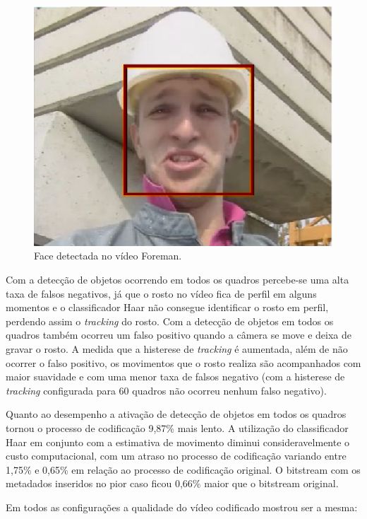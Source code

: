 \begin{figure}[H]
\centering
\includegraphics[scale=0.6]{imagens/fig21.eps}
\caption{Face detectada no vídeo Foreman.}
\label{fig:foreman_example}
\end{figure}

Com a detecção de objetos ocorrendo em todos os quadros percebe-se uma alta taxa de falsos negativos, já que o rosto no vídeo fica de perfil em alguns momentos e o classificador Haar não consegue identificar o rosto em perfil, perdendo assim o \textit{tracking} do rosto. Com a detecção de objetos em todos os quadros também ocorreu um falso positivo quando a câmera se move e deixa de gravar o rosto. A medida que a histerese de \textit{tracking} é aumentada, além de não ocorrer o falso positivo, os movimentos que o rosto realiza são acompanhados com maior suavidade e com uma menor taxa de falsos negativo (com a histerese de \textit{tracking} configurada para 60 quadros não ocorreu nenhum falso negativo). 

Quanto ao desempenho a ativação de detecção de objetos em todos os quadros tornou o processo de codificação 9,87\% mais lento. A utilização do classificador Haar em conjunto com a estimativa de movimento diminui consideravelmente o custo computacional, com um atraso no processo de codificação variando entre 1,75\% e 0,65\% em relação ao processo de codificação original. O bitstream com os metadados inseridos no pior caso ficou 0,66\% maior que o bitstream original.


Em todos as configurações a qualidade do vídeo codificado mostrou ser a mesma:

